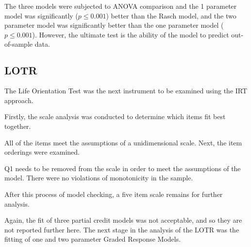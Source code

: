 \documentclass{article}
\begin{document}
The three models were subjected to ANOVA comparison and the 1 parameter model was significantly ($p\le0.001$) better than the Rasch model, and the two parameter model was significantly better than the one parameter model ($p\le0.001$). However, the ultimate test is the ability of the model to predict out-of-sample data. 

\subsection{LOTR}
\label{sec:lotr}

The Life Orientation Test was the next instrument to be examined using the IRT approach.

Firstly, the scale analysis was conducted to determine which items fit best together.


All of the items meet the assumptions of a unidimensional scale.  Next, the item orderings were examined.



Q1 needs to be removed from the scale in order to meet the assumptions of the model. There were no violations of monotonicity in the sample.




After this process of model checking, a five item scale remains for further analysis. 










Again, the fit of three partial credit models was not acceptable, and so they are not reported further here. 
The next stage in the analysis of the LOTR was the fitting of one and two parameter Graded Response Models. 
\end{document}
